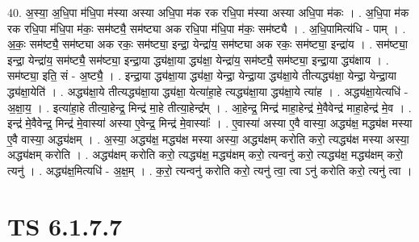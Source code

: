 \documentclass[17pt]{extarticle}
\begin{document}
40. अ॒स्या॒ अ॒धि॒पा म॑धि॒पा म॑स्या अस्या अधि॒पा म॑क रक रधि॒पा म॑स्या अस्या अधि॒पा म॑कः । . अ॒धि॒पा म॑क रक रधि॒पा म॑धि॒पा म॑कः॒ सम॑ष्ट्यै॒ सम॑ष्ट्या अक रधि॒पा म॑धि॒पा म॑कः॒ सम॑ष्ट्यै । . अ॒धि॒पामित्य॑धि - पाम् । . अ॒कः॒ सम॑ष्ट्यै॒ सम॑ष्ट्या अक रकः॒ सम॑ष्ट्या॒ इन्द्रा॒ येन्द्रा॑य॒ सम॑ष्ट्या अक रकः॒ सम॑ष्ट्या॒ इन्द्रा॑य । . सम॑ष्ट्या॒ इन्द्रा॒ येन्द्रा॑य॒ सम॑ष्ट्यै॒ सम॑ष्ट्या॒ इन्द्रा॒या द्ध्य॑क्षा॒या द्ध्य॑क्षा॒ येन्द्रा॑य॒ सम॑ष्ट्यै॒ सम॑ष्ट्या॒ इन्द्रा॒या द्ध्य॑क्षाय । . सम॑ष्ट्या॒ इति॒ सं - अ॒ष्ट्यै॒ । . इन्द्रा॒या द्ध्य॑क्षा॒या द्ध्य॑क्षा॒ येन्द्रा॒ येन्द्रा॒या द्ध्य॑क्षा॒ये तीत्यद्ध्य॑क्षा॒ येन्द्रा॒ येन्द्रा॒या द्ध्य॑क्षा॒येति॑ । . अद्ध्य॑क्षा॒ये तीत्यद्ध्य॑क्षा॒या द्ध्य॑क्षा॒ येत्या॑हा॒हे त्यद्ध्य॑क्षा॒या द्ध्य॑क्षा॒ये त्या॑ह । . अद्ध्य॑क्षा॒येत्यधि॑ - अ॒क्षा॒य॒ । . इत्या॑हा॒हे तीत्या॒हेन्द्र॒ मिन्द्र॑ मा॒हे तीत्या॒हेन्द्र᳚म् । . आ॒हेन्द्र॒ मिन्द्र॑ माहा॒हेन्द्र॑ मे॒वैवेन्द्र॑ माहा॒हेन्द्र॑ मे॒व । . इन्द्र॑ मे॒वैवेन्द्र॒ मिन्द्र॑ मे॒वास्या॑ अस्या ए॒वेन्द्र॒ मिन्द्र॑ मे॒वास्याः᳚ । . ए॒वास्या॑ अस्या ए॒वै वास्या॒ अद्ध्य॑क्ष॒ मद्ध्य॑क्ष मस्या ए॒वै वास्या॒ अद्ध्य॑क्षम् । . अ॒स्या॒ अद्ध्य॑क्ष॒ मद्ध्य॑क्ष मस्या अस्या॒ अद्ध्य॑क्षम् करोति करो॒ त्यद्ध्य॑क्ष मस्या अस्या॒ अद्ध्य॑क्षम् करोति । . अद्ध्य॑क्षम् करोति करो॒ त्यद्ध्य॑क्ष॒ मद्ध्य॑क्षम् करो॒ त्यन्वनु॑ करो॒ त्यद्ध्य॑क्ष॒ मद्ध्य॑क्षम् करो॒ त्यनु॑ । . अद्ध्य॑क्ष॒मित्यधि॑ - अ॒क्ष॒म् । . क॒रो॒ त्यन्वनु॑ करोति करो॒ त्यनु॑ त्वा॒ त्वा ऽनु॑ करोति करो॒ त्यनु॑ त्वा । \newline
\pagebreak
{}

\section{ TS 6.1.7.7 }
\end{document}
